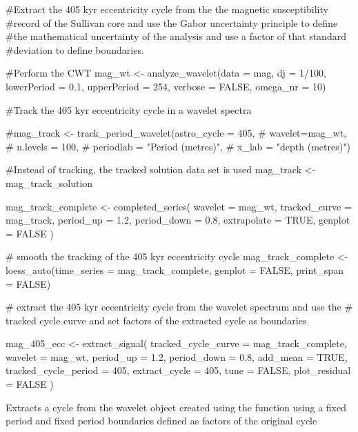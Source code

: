 \documentclass[a4paper]{book}
\begin{document}
%
\begin{Examples}
\begin{ExampleCode}

#Extract the 405 kyr eccentricity cycle from the the magnetic susceptibility \cr
#record of the Sullivan core and use the Gabor uncertainty principle to define \cr
#the mathematical uncertainty of the analysis and use a factor of that standard \cr
#deviation to define boundaries.

#Perform the CWT
mag_wt <- analyze_wavelet(data = mag,
dj = 1/100,
lowerPeriod = 0.1,
upperPeriod = 254,
verbose = FALSE,
omega_nr = 10)

#Track the 405 kyr eccentricity cycle in a wavelet spectra

#mag_track <- track_period_wavelet(astro_cycle = 405,
#                                   wavelet=mag_wt,
#                                   n.levels = 100,
#                                   periodlab = "Period (metres)",
#                                   x_lab = "depth (metres)")

#Instead of tracking, the tracked solution data set  is used \cr
mag_track <- mag_track_solution


mag_track_complete <- completed_series(
  wavelet = mag_wt,
  tracked_curve = mag_track,
  period_up = 1.2,
  period_down = 0.8,
  extrapolate = TRUE,
  genplot = FALSE
)

# smooth the tracking of the 405 kyr eccentricity cycle
mag_track_complete <- loess_auto(time_series = mag_track_complete,
genplot = FALSE, print_span = FALSE)

# extract the 405 kyr eccentricity cycle from the wavelet spectrum and use the \cr
# tracked cycle curve and set factors of the extracted cycle as boundaries

mag_405_ecc  <- extract_signal(
tracked_cycle_curve = mag_track_complete,
wavelet = mag_wt,
period_up = 1.2,
period_down = 0.8,
add_mean = TRUE,
tracked_cycle_period = 405,
extract_cycle = 405,
tune = FALSE,
plot_residual = FALSE
)

\end{ExampleCode}
\end{Examples}
%
\begin{Description}
Extracts a cycle from the wavelet object created using the 
function using a fixed period and fixed period boundaries defined as factors of the original cycle
\end{Description}
\end{document}
